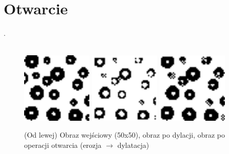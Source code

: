 \documentclass[final,a4paper,openany,12pt]{mwbk}
\begin{document}
\section{ Otwarcie}
.
\hfill
\\\\
\indent

\begin{figure}[H]
	\begin{center}
		\includegraphics[width=0.3\textwidth]{1/1Bin_Op_Original}
		\includegraphics[width=0.3\textwidth]{1/1Bin_Op_E_Result}
		\includegraphics[width=0.3\textwidth]{1/1Bin_Op_ED_Result}
	\end{center}
	\caption{(Od lewej) Obraz wejściowy (50x50), obraz po dylacji, obraz po operacji otwarcia (erozja $\rightarrow$ dylatacja)}
\end{figure}
\end{document}
